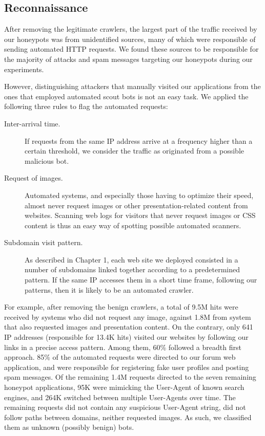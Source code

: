 \subsection{Reconnaissance}

After removing the legitimate crawlers, the largest part of the traffic received by our honeypots was from unidentified sources, many of which were responsible of sending automated HTTP requests. We found these sources to be responsible for the majority of attacks and spam messages targeting our honeypots during our experiments.

However, distinguishing attackers that manually visited our applications from the ones that employed automated scout bots is not an easy task. We applied the following three rules to flag the automated requests:

\begin{description}
\item[Inter-arrival time.] If requests from the same IP address arrive at a frequency higher than a certain threshold, we consider the traffic as originated from a possible malicious bot.
\item[Request of images.] Automated systems, and especially those having to optimize their speed, almost never request images or other presentation-related content from websites. Scanning web logs for visitors that never request images or CSS content is thus an easy way of spotting possible automated scanners.
\item[Subdomain visit pattern.] As described in Chapter 1, each web site we deployed consisted in a number of subdomains linked together according to a predetermined pattern. If the same IP accesses them in a short time frame, following our patterns, then it is likely to be an automated crawler.
\end{description}

For example, after removing the benign crawlers, a total of 9.5M hits were received by systems who did not request any image, against 1.8M from system that also requested images and presentation content. On the contrary, only 641 IP addresses (responsible for 13.4K hits) visited our websites by following our links in a precise access pattern. Among them, 60\% followed a breadth first approach.
85\% of the automated requests were directed to our forum web application, and were responsible for registering fake user profiles and posting spam messages. Of the remaining 1.4M requests directed to the seven remaining honeypot applications, 95K were mimicking the User-Agent of known search engines, and 264K switched between multiple User-Agents over time. The remaining requests did not contain any suspicious User-Agent string, did not follow paths between domains, neither requested images. As such, we classified them as unknown (possibly benign) bots.

